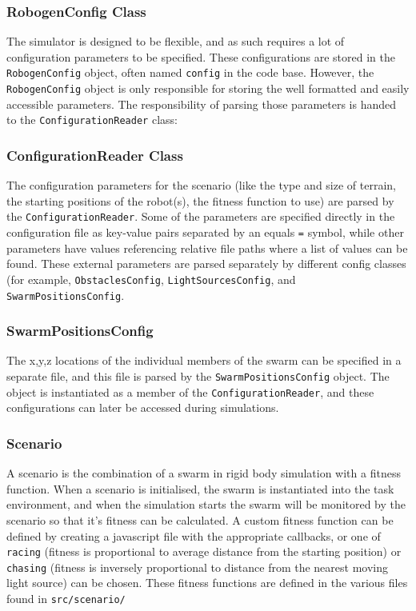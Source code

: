 \documentclass[11pt,a4paper]{article}
\begin{document}
\subsubsection{RobogenConfig Class}
The simulator is designed to be flexible, and as such requires a lot of
configuration parameters to be specified. These configurations are stored in
the \texttt{RobogenConfig} object, often named \texttt{config} in the code
base. However, the \texttt{RobogenConfig} object is only responsible for storing the
well formatted and easily accessible parameters. The responsibility of parsing
those parameters is handed to the \texttt{ConfigurationReader} class:

\subsubsection{ConfigurationReader Class}
The configuration parameters for the scenario (like the type and size of
terrain, the starting positions of the robot(s), the fitness function to use)
are parsed by the \texttt{ConfigurationReader}. Some of the parameters are
specified directly in the configuration file as key-value pairs separated by an
equals \texttt{=} symbol, while other parameters have values referencing
relative file paths where a list of values can be found. These external
parameters are parsed separately by different config classes (for example,
\texttt{ObstaclesConfig}, \texttt{LightSourcesConfig}, and
\texttt{SwarmPositionsConfig}.

\subsubsection{SwarmPositionsConfig}
The x,y,z locations of the individual members of the swarm can be specified in
a separate file, and this file is parsed by the \texttt{SwarmPositionsConfig}
object. The object is instantiated as a member of the
\texttt{ConfigurationReader}, and these configurations can later be accessed
during simulations.

\subsubsection{Scenario}
A scenario is the combination of a swarm in rigid body simulation with a
fitness function. When a scenario is initialised, the swarm is instantiated
into the task environment, and when the simulation starts the swarm will be
monitored by the scenario so that it's fitness can be calculated. A custom
fitness function can be defined by creating a javascript file with the
appropriate callbacks, or one of \texttt{racing} (fitness is proportional to
average distance from the starting position) or \texttt{chasing} (fitness is
inversely proportional to distance from the nearest moving light source) can be
chosen. These fitness functions are defined in the various files found in
\texttt{src/scenario/}
\end{document}
